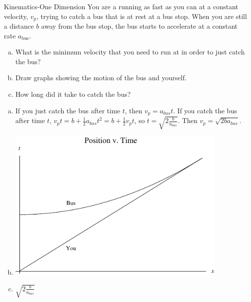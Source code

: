 \documentclass{esg8012pset}
\begin{document}
\begin{problem}{Kinematics-One Dimension}
  You are a running as fast as you can at a constant velocity, $v_p$, trying to catch a bus that is at rest
  at a bus stop. When you are still a distance $b$ away from the bus stop, the bus starts to accelerate
  at a constant rate $a_\text{bus}$.
  \begin{enumerate}[a)]
    \item What is the minimum velocity that you need to run at in order to just catch the bus?
    \item Draw graphs showing the motion of the bus and yourself.
    \item How long did it take to catch the bus?
  \end{enumerate}
\end{problem}
\begin{solution}
  \begin{enumerate}[a)]
    \item If you just catch the bus after time $t$, then $v_p = a_{bus}t$.  If you catch the bus after time $t$, $v_p t = b + \frac{1}{2}a_{bus}t^2 = b + \frac{1}{2}v_p t$, so $t = \sqrt{2\frac{b}{a_{bus}}}$.  Then $v_p = \sqrt{2 b a_{bus}}$.
    \item \includegraphics[width=0.85\textwidth]{ps01_Plot_4}
    \item $\sqrt{2\frac{b}{a_{bus}}}$
  \end{enumerate}
\end{solution}
\end{document}
